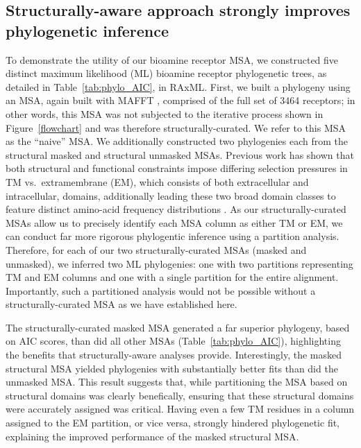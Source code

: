 \documentclass[fleqn,10pt]{wlpeerj}
\begin{document}
\subsection*{Structurally-aware approach strongly improves phylogenetic inference}

To demonstrate the utility of our bioamine receptor MSA, we constructed five distinct maximum likelihood (ML) bioamine receptor phylogenetic trees, as detailed in Table~\ref{tab:phylo_AIC}, in RAxML. First, we built a phylogeny using an MSA, again built with MAFFT \citep{mafftv7}, comprised of the full set of 3464 receptors; in other words, this MSA was not subjected to the iterative process shown in Figure~\ref{flowchart} and was therefore structurally-curated. We refer to this MSA as the ``naive'' MSA. We additionally constructed two phylogenies each from the structural masked and structural unmasked MSAs. Previous work has shown that both structural and functional constraints impose differing selection pressures in TM vs.\ extramembrane (EM), which consists of both extracellular and intracellular, domains, additionally leading these two broad domain classes to feature distinct amino-acid frequency distributions \cite{Tourasse2000,Stevens2001,Julenius2006,Oberai2009,SpielmanWilke2013,FranzosaXueXia2013}.
As our structurally-curated MSAs allow us to precisely identify each MSA column as either TM or EM, we can conduct far more rigorous phylogentic inference using a partition analysis. Therefore, for each of our two structurally-curated MSAs (masked and unmasked), we inferred two ML phylogenies: one with two partitions representing TM and EM columns and one with a single partition for the entire alignment. Importantly, such a partitioned analysis would not be possible without a structurally-curated MSA as we have established here.

The structurally-curated masked MSA generated a far superior phylogeny, based on AIC scores, than did all other MSAs (Table~\ref{tab:phylo_AIC}), highlighting the benefits that structurally-aware analyses provide. Interestingly, the masked structural MSA yielded phylogenies with substantially better fits than did the unmasked MSA. This result suggests that, while partitioning the MSA based on structural domains was clearly benefically, ensuring that these structural domains were accurately assigned was critical. Having even a few TM residues in a column assigned to the EM partition, or vice versa, strongly hindered phylogenetic fit, explaining the improved performance of the masked structural MSA.
\end{document}
